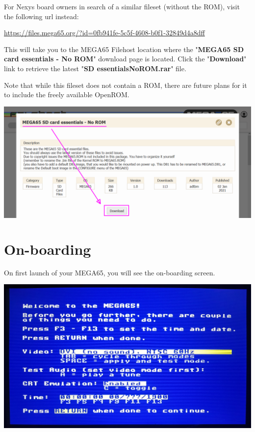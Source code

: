 For Nexys board owners in search of a similar fileset (without the ROM), visit the following url instead:

\url{https://files.mega65.org/?id=0fb941fe-5c5f-4608-b0f1-32849d4a8dff}

This will take you to the MEGA65 Filehost location where the "\textbf{MEGA65 SD card essentials - No ROM}" download page is located. Click the "\textbf{Download}" link to retrieve the latest "\textbf{SD essentialsNoROM.rar}" file.

Note that while this fileset does not contain a ROM, there are future plans for it to include the freely available OpenROM.

\includegraphics[width=\linewidth]{images/latest_support_files.png}

\section{On-boarding}

On first launch of your MEGA65, you will see the on-boarding screen.

\begin{center}
  \includegraphics[width=\linewidth]{images/img011_final_boot_01.jpg}
\end{center}

